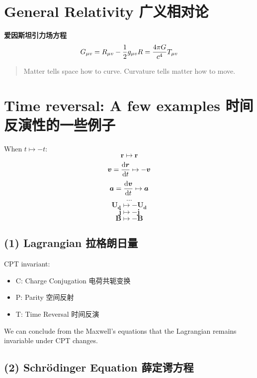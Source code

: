 \section{General Relativity 广义相对论}\label{general-relativity-ux5e7fux4e49ux76f8ux5bf9ux8bba}

\textbf{爱因斯坦引力场方程} \[G_{\mu v}=R_{\mu v}-{1\over2}g_{\mu v}R=\frac{4\pi G}{c^4}T_{\mu v}\]

\begin{quote}
Matter tells space how to curve. Curvature tells matter how to move.
\end{quote}

\section{Time reversal: A few examples 时间反演性的一些例子}\label{time-reversal-a-few-examples-ux65f6ux95f4ux53cdux6f14ux6027ux7684ux4e00ux4e9bux4f8bux5b50}

When \(t \mapsto -t\): \[\boldsymbol r \mapsto \boldsymbol r\] \[\boldsymbol v = {\mathrm d \boldsymbol r \over \mathrm dt} \mapsto - \boldsymbol v\] \[\boldsymbol a = {\mathrm d \boldsymbol v \over \mathrm dt} \mapsto \boldsymbol a\] \[\cdots\] \[\boldsymbol {U_d} \mapsto -\boldsymbol {U_d} \] \[\boldsymbol j \mapsto - \boldsymbol j\] \[\boldsymbol B \mapsto - \boldsymbol B \]

\subsection*{(1) Lagrangian 拉格朗日量}\label{lagrangian-ux62c9ux683cux6717ux65e5ux91cf}

CPT invariant:

\begin{itemize}
\tightlist{}
\item
  C: Charge Conjugation 电荷共轭变换
\item
  P: Parity 空间反射
\item
  T: Time Reversal 时间反演
\end{itemize}

We can conclude from the Maxwell's equations that the Lagrangian remains invariable under CPT changes.

\subsection*{(2) Schrödinger Equation 薛定谔方程}\label{schruxf6dinger-equation-ux859bux5b9aux8c14ux65b9ux7a0b-1} 

